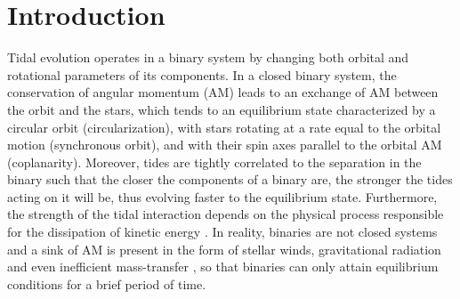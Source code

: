 \documentclass{aa}
\begin{document}
\maketitle

\section{Introduction}
\label{section:introduction}

Tidal evolution operates in a binary system by changing both orbital and rotational parameters of its components. In a closed binary
system, the conservation of angular momentum (AM) leads to an exchange of AM between the orbit and the stars, which tends to an equilibrium
state characterized by a circular orbit (circularization), with stars rotating at a rate equal to the orbital motion (synchronous orbit),
and with their spin axes parallel to the orbital AM (coplanarity). Moreover, tides are tightly correlated to the separation in the binary
such that the closer the components of a binary are, the stronger the tides acting on it will be, thus evolving faster to the equilibrium
state. Furthermore, the strength of the tidal interaction depends on the physical process responsible for the dissipation of kinetic energy
\citep{zahn2008}. In reality, binaries are not closed systems and a sink of AM is present in the form of stellar winds, gravitational
radiation and even inefficient mass-transfer \citep{landau1975,soberman1997}, so that binaries can only attain equilibrium conditions for a
brief period of time.
\end{document}
